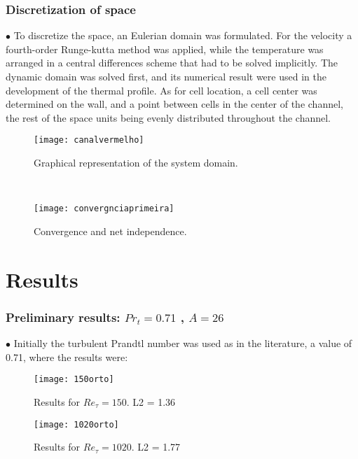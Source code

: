 \documentclass[xcolor=dvipsnames,8pt,aspectratio=34]{beamer}
\begin{document}
		\begin{frame}
			\frametitle{Discretization of space}
			\begin{minipage}[h!]{0.5\textwidth}
			$\bullet$ To discretize the space, an Eulerian domain was formulated. For the velocity a fourth-order Runge-kutta method was applied, while the temperature was arranged in a central differences scheme that had to be solved implicitly. The dynamic domain was solved first, and its numerical result were used in the development of the thermal profile. As for cell location, a cell center was determined on the wall, and a point between cells in the center of the channel, the rest of the space units being evenly distributed throughout the channel.
			\end{minipage}\hfill
			\begin{minipage}[h!]{0.45\textwidth}
			\begin{figure}
				\centering
				\texttt{[image: canalvermelho]}
				\caption{Graphical representation of the system domain.}
				\label{sistema}
			\end{figure}
			\end{minipage}\\
		\end{frame}
	
	
	
	
	
			\begin{frame}
		\begin{figure}
			\centering
			\texttt{[image: convergnciaprimeira]}
			\caption{Convergence and net independence.}
			\label{convergencia}
		\end{figure}
	\end{frame}
		
	
	
	
		
	\section{Results}
		\begin{frame}
			\frametitle{Preliminary results: $Pr_t= 0.71$ , $A = 26 $}
				$\bullet$ Initially the turbulent Prandtl number was used as in the literature, a value of 0.71, where the results were:\\
			\begin{minipage}[h!]{0.5\textwidth}
			\begin{figure}
				\centering
				\texttt{[image: 150orto]}
				\caption{Results for $Re_\tau = 150$. L2 = 1.36 }
			\end{figure}
			\end{minipage}
				\begin{minipage}[h!]{0.49\textwidth}
				\begin{figure}
					\centering
					\texttt{[image: 1020orto]}
					\caption{Results for $Re_\tau = 1020$. L2 = 1.77}
				\end{figure}
			\end{minipage}		
		\end{frame}
	
\end{document}
